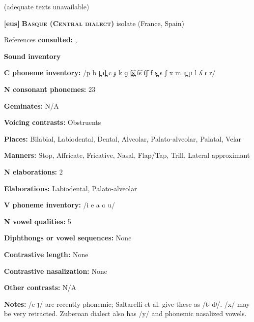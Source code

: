 (adequate texts unavailable)



\textbf{[eus]}   \textbf{\textsc{Basque (Central dialect)}}  isolate (France, Spain)



References \textbf{consulted:} \citet{Hualde2003}, \citet{SaltarelliEtAl1988}



\textbf{Sound inventory}



\textbf{C phoneme inventory:} /p b t̪ d̪ c ɟ k ɡ t̪͡s̪ t͡s t͡ʃ f s̪ s ʃ x m n̪ ɲ l ʎ ɾ r/



\textbf{N consonant phonemes:} 23



\textbf{Geminates:} N/A



\textbf{Voicing contrasts:} Obstruents



\textbf{Places:} Bilabial, Labiodental, Dental, Alveolar, Palato-alveolar, Palatal, Velar



\textbf{Manners:} Stop, Affricate, Fricative, Nasal, Flap/Tap, Trill, Lateral approximant



\textbf{N elaborations:} 2



\textbf{Elaborations:} Labiodental, Palato-alveolar



\textbf{V phoneme inventory:} /i e a o u/



\textbf{N vowel qualities:} 5



\textbf{Diphthongs or vowel sequences:} None



\textbf{Contrastive length:} None



\textbf{Contrastive nasalization:} None



\textbf{Other contrasts:} N/A



\textbf{Notes:} /c ɟ/ are recently phonemic; Saltarelli et al. give these as /tʲ dʲ/. /x/ may be very retracted. Zuberoan dialect also has /y/ and phonemic nasalized vowels.



